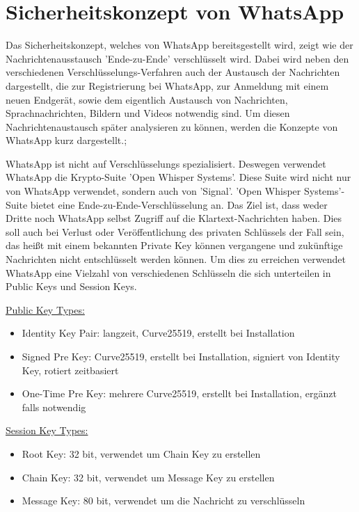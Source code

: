 \section{Sicherheitskonzept von WhatsApp}\label{sec:kaptiel}
\cite{ENCOV}Das Sicherheitskonzept, welches von WhatsApp bereitsgestellt wird, zeigt wie
der Nachrichtenausstausch 'Ende-zu-Ende' verschlüsselt wird. Dabei wird neben
den verschiedenen Verschlüsselungs-Verfahren auch der Austausch der Nachrichten
dargestellt, die zur Registrierung bei WhatsApp, zur Anmeldung mit einem neuen
Endgerät, sowie dem eigentlich Austausch von Nachrichten, Sprachnachrichten, Bildern
und Videos notwendig sind. 
Um diesen Nachrichtenaustausch später analysieren zu können, werden die Konzepte
von WhatsApp kurz dargestellt.\cite{ENCOV}; 

WhatsApp ist nicht auf Verschlüsselungs spezialisiert. Deswegen verwendet WhatsApp
die Krypto-Suite 'Open Whisper Systems'. Diese Suite wird nicht nur von WhatsApp verwendet, 
sondern auch von 'Signal'.
'Open Whisper Systems'-Suite bietet eine Ende-zu-Ende-Verschlüsselung an. Das Ziel
ist, dass weder Dritte noch WhatsApp selbst Zugriff auf die Klartext-Nachrichten haben.
Dies soll auch bei Verlust oder Veröffentlichung des privaten Schlüssels der Fall sein, 
das heißt mit einem bekannten Private Key können vergangene und zukünftige Nachrichten
nicht entschlüsselt werden können. Um dies zu erreichen verwendet WhatsApp eine 
Vielzahl von verschiedenen Schlüsseln die sich unterteilen in Public Keys und Session Keys. 

\underline{Public Key Types: }
    \begin{itemize}
        \item Identity Key Pair: langzeit, Curve25519, erstellt bei Installation 
        \item Signed Pre Key: Curve25519, erstellt bei Installation, signiert von Identity Key, rotiert zeitbasiert
        \item One-Time Pre Key: mehrere Curve25519, erstellt bei Installation, ergänzt falls notwendig
    \end{itemize}
    
\underline{Session Key Types:}
    \begin{itemize}
        \item Root Key: 32 bit, verwendet um Chain Key zu erstellen
        \item Chain Key: 32 bit, verwendet um Message Key zu erstellen
        \item Message Key: 80 bit, verwendet um die Nachricht zu verschlüsseln 
    \end{itemize}

